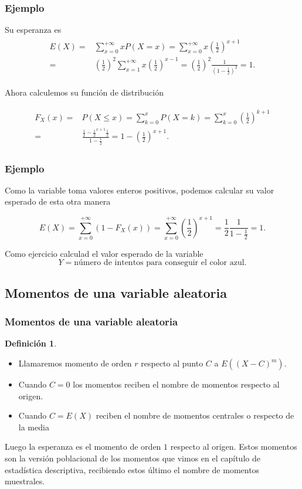 \documentclass[handout]{beamer}\usepackage[]{graphicx}\usepackage[]{color}
\renewcommand{\emph}[1]{{\color{red}#1}}
\renewcommand{\leq}{\leqslant}
\theoremstyle{plain}
\theoremstyle{definition}
\newtheorem{definicion}{Definición}
\begin{document}
\begin{frame}
\frametitle{Ejemplo}
Su esperanza es 
\begin{align*}
\begin{split}
E(X)=&\sum_{x=0}^{+\infty} x P(X=x)=\sum_{x=0}^{+\infty} x
\left(\frac{1}{2}\right)^{x+1}\\
= & 
\left(\frac{1}{2}\right)^2\sum_{x=1}^{+\infty} x
\left(\frac{1}{2}\right)^{x-1}=\left(\frac{1}{2}\right)^2
\frac{1}{\left(1-\frac{1}{2}\right)^2}=1.
\end{split}
\end{align*}



Ahora calculemos su función de distribución

\begin{align*}
\begin{split}
F_X(x)=& P(X\leq x)=\sum_{k=0}^x P(X=k)=\sum_{k=0}^x
\left(\frac{1}{2}\right)^{k+1}\\
=& \frac{\frac{1}{2}-\frac{1}{2}^{x+1}
\frac{1}{2}}{1-\frac{1}{2}}=1-(\frac{1}{2})^{x+1}.
\end{split}
\end{align*}
\end{frame}



\begin{frame}
\frametitle{Ejemplo}

Como la variable toma valores enteros positivos, podemos calcular su valor esperado
de esta otra manera

$$E(X)=\sum_{x=0}^{+\infty} (1-F_X(x))=\sum_{x=0}^{+\infty}(\frac{1}{2})^{x+1}=\frac{1}{2}
\frac{1}{1-\frac{1}{2}}=1.$$

Como ejercicio  calculad el valor esperado de la variable
$$Y=\mbox{número de intentos
para conseguir el color azul.}$$

\end{frame}

\subsection{Momentos de una variable aleatoria}
\begin{frame}
\frametitle{Momentos de una variable aleatoria}

\begin{definicion}
\begin{itemize}
\item Llamaremos  \emph{momento de orden $r$} respecto al punto $C$ a $E\left((X-C)^m\right)$.
\item Cuando $C=0$ los momentos reciben el nombre de \emph{momentos respecto al origen}.
\item Cuando $C=E(X)$ reciben el nombre de \emph{momentos centrales o respecto de la media}
\end{itemize}
\end{definicion}


Luego la esperanza es el momento de orden $1$ respecto al origen. 
Estos momentos son la versión poblacional de los momentos que vimos en el capítulo de estadística descriptiva, recibiendo estos último el nombre de momentos muestrales.

\end{frame}
\end{document}
